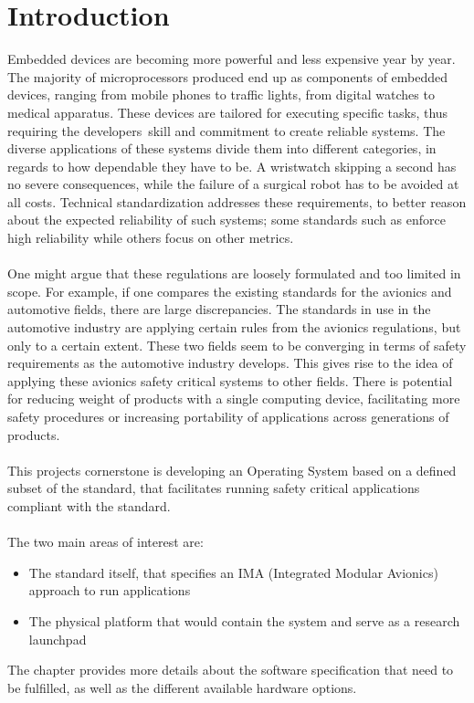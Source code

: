 \chapter{Introduction}\label{ch:introduction}

Embedded devices are becoming more powerful and less expensive year by year.
The majority of microprocessors produced end up as components of embedded devices,
ranging from mobile phones to traffic lights, from digital watches to medical apparatus.
These devices are tailored for executing specific tasks,
thus requiring the developers\textquotesingle\ skill and commitment to create reliable systems.
The diverse applications of these systems divide them into different categories,
in regards to how dependable they have to be. A wristwatch skipping a second has no severe consequences,
while the failure of a surgical robot has to be avoided at all costs.
Technical standardization addresses these requirements,
to better reason about the expected reliability of such systems;
some standards such as \arinc{}\cite{arinc_whole_standard} enforce high reliability while others focus on other metrics.
\\\\
One might argue that these regulations are loosely formulated and too limited in scope.
For example, if one compares the existing standards for the avionics and automotive fields,
there are large discrepancies.
The standards in use in the automotive industry are applying certain rules from the avionics regulations,
but only to a certain extent\cite{can_cars_fly}.
These two fields seem to be converging in terms of safety requirements as the automotive industry develops.
This gives rise to the idea of applying these avionics safety critical systems to other fields.
There is potential for reducing weight of products with a single
computing device\cite{boeing_weight_reduction},
facilitating more safety procedures
or increasing portability of applications across generations of products.
\\\\
This project\textquotesingle s cornerstone is developing an Operating System based on a defined subset of the \arinc{} standard,
that facilitates running safety critical applications compliant with the \arinc{} standard.
\\\\
The two main areas of interest are:
\\
\begin{itemize}
\item The standard itself, that specifies an IMA
(Integrated Modular Avionics) approach to run applications
\item The physical platform that would contain the system and serve as a research launchpad
\end{itemize}
The  chapter provides more details about the software specification that need to be fulfilled,
as well as the different available hardware options.
